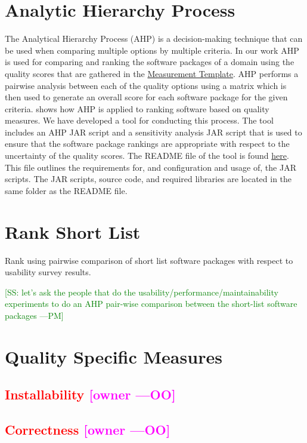 \documentclass[letterpaper,cleveref]{lipics-v2019}
\newcommand{\authornote}[3]{\textcolor{#1}{[#3 ---#2]}}
\newcommand{\authornote}[3]{}
\newcommand{\oo}[1]{\authornote{magenta}{OO}{#1}} %
\newcommand{\pmi}[1]{\authornote{green}{PM}{#1}} %
\newcommand{\notdone}[1]{\textcolor{red}{#1}}
\theoremstyle{definition}
\begin{document}
\section{Analytic Hierarchy Process} \label{SecAHP}
The Analytical Hierarchy Process (AHP) is a decision-making technique that can be used when comparing multiple options by multiple criteria. In our work AHP is used for comparing and ranking the software packages of a domain using the quality scores that are gathered in the \href{run:Combined_MeasurementTemplate_EmpiricalMeasures.xlsx}{Measurement Template}. AHP performs a pairwise analysis between each of the quality options using a matrix which is then used to generate an overall score for each software package for the given criteria. \cite{SmithEtAl2016} shows how AHP is applied to ranking software based on quality measures. We have developed a tool for conducting this process. The tool includes an AHP JAR script and a sensitivity analysis JAR script that is used to ensure that the software package rankings are appropriate with respect to the uncertainty of the quality scores. The README file of the tool is found \href{run:../AHP2020/LBM/README.txt}{here}. This file outlines the requirements for, and configuration and usage of, the JAR scripts. The JAR scripts, source code, and required libraries are located in the same folder as the README file.

\section{Rank Short List} \label{SecRankShortList}
Rank using pairwise comparison of short list software packages with respect to usability survey results.

\pmi{SS: let's ask the people that do the usability/performance/maintainability experiments to do an AHP pair-wise comparison between the short-list software packages}

\section{Quality Specific Measures}

\subsection{\notdone{Installability} \oo{owner}}

\subsection{\notdone{Correctness} \oo{owner}}
\end{document}
